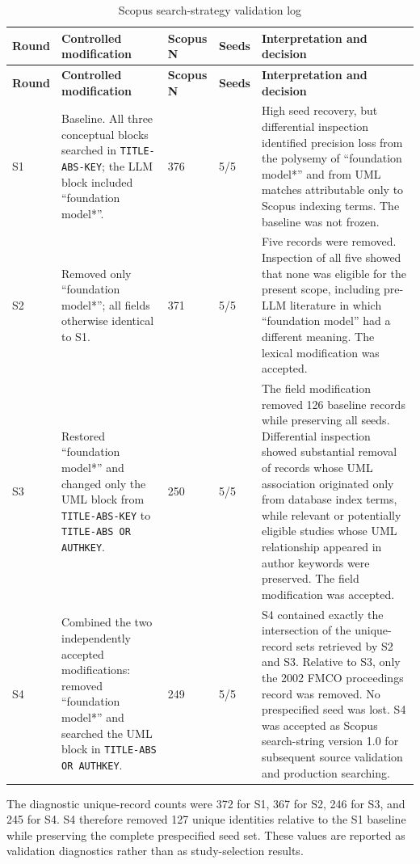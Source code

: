 \begin{longtable}{p{} p{} p{} p{} p{}}
\caption{Scopus search-strategy validation log}
\label{tab:scopus_validation_rounds}\\
\toprule
\textbf{Round} & \textbf{Controlled modification} & \textbf{Scopus N} & \textbf{Seeds} & \textbf{Interpretation and decision} \\
\midrule
\endfirsthead
\toprule
\textbf{Round} & \textbf{Controlled modification} & \textbf{Scopus N} & \textbf{Seeds} & \textbf{Interpretation and decision} \\
\midrule
\endhead
S1 & Baseline. All three conceptual blocks searched in \texttt{TITLE-ABS-KEY}; the LLM block included ``foundation model*''. & 376 & 5/5 & High seed recovery, but differential inspection identified precision loss from the polysemy of ``foundation model*'' and from UML matches attributable only to Scopus indexing terms. The baseline was not frozen. \\
S2 & Removed only ``foundation model*''; all fields otherwise identical to S1. & 371 & 5/5 & Five records were removed. Inspection of all five showed that none was eligible for the present scope, including pre-LLM literature in which ``foundation model'' had a different meaning. The lexical modification was accepted. \\
S3 & Restored ``foundation model*'' and changed only the UML block from \texttt{TITLE-ABS-KEY} to \texttt{TITLE-ABS OR AUTHKEY}. & 250 & 5/5 & The field modification removed 126 baseline records while preserving all seeds. Differential inspection showed substantial removal of records whose UML association originated only from database index terms, while relevant or potentially eligible studies whose UML relationship appeared in author keywords were preserved. The field modification was accepted. \\
S4 & Combined the two independently accepted modifications: removed ``foundation model*'' and searched the UML block in \texttt{TITLE-ABS OR AUTHKEY}. & 249 & 5/5 & S4 contained exactly the intersection of the unique-record sets retrieved by S2 and S3. Relative to S3, only the 2002 FMCO proceedings record was removed. No prespecified seed was lost. S4 was accepted as Scopus search-string version 1.0 for subsequent source validation and production searching. \\
\bottomrule
\end{longtable}

The diagnostic unique-record counts were 372 for S1, 367 for S2, 246 for S3,
and 245 for S4. S4 therefore removed 127 unique identities relative to the S1
baseline while preserving the complete prespecified seed set. These values are
reported as validation diagnostics rather than as study-selection results.

